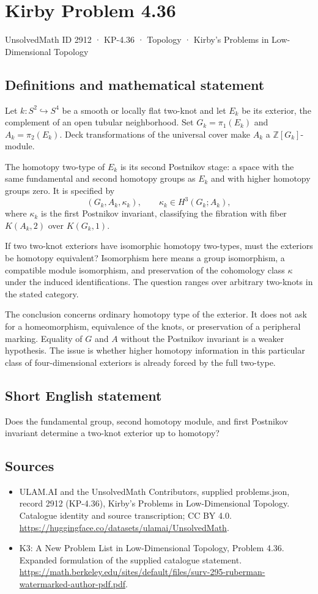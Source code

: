 \documentclass[11pt,a4paper]{article}
\begin{document}
\section*{Kirby Problem 4.36}\label{2912}
{\small UnsolvedMath ID 2912 · KP-4.36 · Topology · Kirby's Problems in Low-Dimensional Topology}
\subsection{Definitions and mathematical statement}
Let $k:S^2\hookrightarrow S^4$ be a smooth or locally flat two-knot and let $E_k$ be its exterior, the complement of an open tubular neighborhood. Set $G_k=\pi_1(E_k)$ and $A_k=\pi_2(E_k)$. Deck transformations of the universal cover make $A_k$ a $\mathbb Z[G_k]$-module.

The homotopy two-type of $E_k$ is its second Postnikov stage: a space with the same fundamental and second homotopy groups as $E_k$ and with higher homotopy groups zero. It is specified by
\[
(G_k,A_k,\kappa_k),\qquad
\kappa_k\in H^3(G_k;A_k),
\]
where $\kappa_k$ is the first Postnikov invariant, classifying the fibration with fiber $K(A_k,2)$ over $K(G_k,1)$.

If two two-knot exteriors have isomorphic homotopy two-types, must the exteriors be homotopy equivalent? Isomorphism here means a group isomorphism, a compatible module isomorphism, and preservation of the cohomology class $\kappa$ under the induced identifications. The question ranges over arbitrary two-knots in the stated category.

The conclusion concerns ordinary homotopy type of the exterior. It does not ask for a homeomorphism, equivalence of the knots, or preservation of a peripheral marking. Equality of $G$ and $A$ without the Postnikov invariant is a weaker hypothesis. The issue is whether higher homotopy information in this particular class of four-dimensional exteriors is already forced by the full two-type.
\subsection{Short English statement}
Does the fundamental group, second homotopy module, and first Postnikov invariant determine a two-knot exterior up to homotopy?
\subsection{Sources}
\begin{itemize}
\item[S1] ULAM.AI and the UnsolvedMath Contributors, supplied problems.json, record 2912 (KP-4.36), Kirby's Problems in Low-Dimensional Topology. Catalogue identity and source transcription; CC BY 4.0.
\url{https://huggingface.co/datasets/ulamai/UnsolvedMath}.
\item[S2] K3: A New Problem List in Low-Dimensional Topology, Problem 4.36. Expanded formulation of the supplied catalogue statement.
\url{https://math.berkeley.edu/sites/default/files/surv-295-ruberman-watermarked-author-pdf.pdf}.
\end{itemize}
\end{document}
